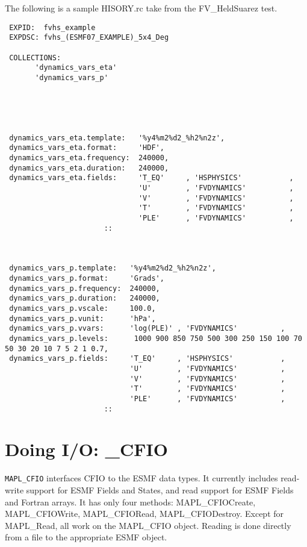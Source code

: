  The following is a sample HISORY.rc take from the FV\_HeldSuarez test.
 \begin{verbatim}
 EXPID:  fvhs_example
 EXPDSC: fvhs_(ESMF07_EXAMPLE)_5x4_Deg
 
 COLLECTIONS:
       'dynamics_vars_eta'
       'dynamics_vars_p'
 
 
 
 
 
 dynamics_vars_eta.template:   '%y4%m2%d2_%h2%n2z',
 dynamics_vars_eta.format:     'HDF',
 dynamics_vars_eta.frequency:  240000,
 dynamics_vars_eta.duration:   240000,
 dynamics_vars_eta.fields:     'T_EQ'     , 'HSPHYSICS'           ,
                               'U'        , 'FVDYNAMICS'          ,
                               'V'        , 'FVDYNAMICS'          ,
                               'T'        , 'FVDYNAMICS'          ,
                               'PLE'      , 'FVDYNAMICS'          ,
                       ::
 
 
 
 dynamics_vars_p.template:   '%y4%m2%d2_%h2%n2z',
 dynamics_vars_p.format:     'Grads',
 dynamics_vars_p.frequency:  240000,
 dynamics_vars_p.duration:   240000,
 dynamics_vars_p.vscale:     100.0,
 dynamics_vars_p.vunit:      'hPa',
 dynamics_vars_p.vvars:      'log(PLE)' , 'FVDYNAMICS'          ,   
 dynamics_vars_p.levels:      1000 900 850 750 500 300 250 150 100 70 50 30 20 10 7 5 2 1 0.7,
 dynamics_vars_p.fields:     'T_EQ'     , 'HSPHYSICS'           ,
                             'U'        , 'FVDYNAMICS'          ,
                             'V'        , 'FVDYNAMICS'          ,
                             'T'        , 'FVDYNAMICS'          ,
                             'PLE'      , 'FVDYNAMICS'          ,
                       ::
\end{verbatim}



\section{Doing I/O: \ggn\_CFIO}


{\tt MAPL\_CFIO}  interfaces CFIO to the ESMF data types.
      It currently includes read-write support for ESMF Fields and States,
      and read support for ESMF Fields and Fortran arrays. It has only four methods:
      MAPL\_CFIOCreate, MAPL\_CFIOWrite, MAPL\_CFIORead, MAPL\_CFIODestroy. Except
      for MAPL\_Read, all work on the MAPL\_CFIO object. Reading is done
      directly from a file to the appropriate ESMF object.

